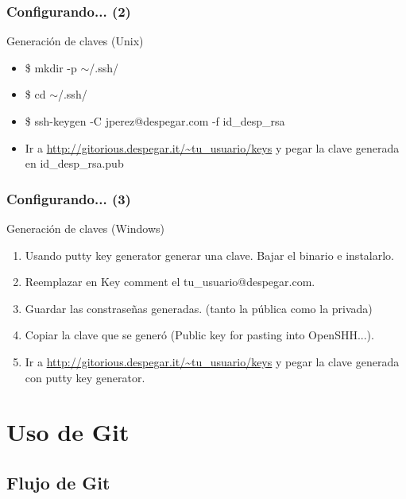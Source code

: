 \documentclass{beamer}
\begin{document}
\begin{frame}\frametitle{Configurando... (2)}
  \begin{block}{Generación de claves (Unix)}
  \begin{itemize}
    \item \$ mkdir -p  $\sim$/.ssh/ \pause 
    \item \$ cd $\sim$/.ssh/ \pause 
    \item \$ ssh-keygen -C jperez@despegar.com -f id\_desp\_rsa \pause 
    \item Ir a \url{http://gitorious.despegar.it/~tu\_usuario/keys} y pegar la clave generada en id\_desp\_rsa.pub
  \end{itemize}
  \end{block}
  
\end{frame}

\begin{frame}\frametitle{Configurando... (3)}

 \begin{block}{Generación de claves (Windows)}
  \begin{enumerate}
   \item Usando putty key generator generar una clave. Bajar el binario e instalarlo. \pause 
    \item Reemplazar en Key comment el tu\_usuario@despegar.com. \pause 
    \item Guardar las constraseñas generadas. (tanto la pública como la privada) \pause 
    \item Copiar la clave que se generó (Public key for pasting into OpenSHH...). \pause 
    \item Ir a \url{http://gitorious.despegar.it/~tu\_usuario/keys} y pegar la clave generada con putty key generator.
  \end{enumerate}

  \end{block}
\end{frame}

\section{Uso de Git}

\subsection{Flujo de Git}
\end{document}
